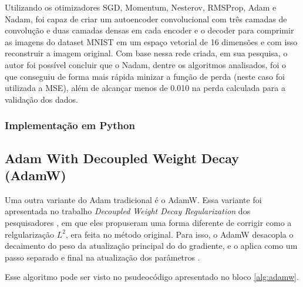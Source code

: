 Utilizando os otimizadores SGD, Momentum, Nesterov, RMSProp, Adam e Nadam, \textcite{NadamMethod} foi capaz de criar um autoencoder convolucional com três camadas de convolução e duas camadas densas em cada encoder e o decoder para comprimir as imagens do dataset MNIST em um espaço vetorial de 16 dimensões e com isso reconstruir a imagem original. Com base nessa rede criada, em sua pesquisa, o autor foi possível concluir que o Nadam, dentre os algoritmos analisados, foi o que conseguiu de forma mais rápida minizar a função de perda (neste caso foi utilizada a MSE), além de alcançar menos de 0.010 na perda calculada para a validação dos dados.

\subsubsection{Implementação em Python}

\subsection{Adam With Decoupled Weight Decay (AdamW)}

Uma outra variante do Adam tradicional é o AdamW. Essa variante foi apresentada no trabalho \textit{Decoupled Weight Decay Regularization} dos pesquisadores \textcite{AdamWMethod}, em que eles propuseram uma forma diferente de corrigir como a relgularização $L^2$, era feita no método original. Para isso, o AdamW desacopla o decaimento do peso da atualização principal do do gradiente, e o aplica como um passo separado e final na atualização dos parâmetros \parencite{AdamWMethod}.

Esse algoritmo pode ser visto no psudeocódigo apresentado no bloco \ref{alg:adamw}.

